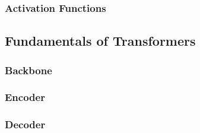       \Blindtext[1]

    \subsubsection{Activation Functions}

      \Blindtext[1]
  
  \subsection{Fundamentals of Transformers}

    \Blindtext[1]

    \subsubsection{Backbone}

      \Blindtext[1]

    \subsubsection{Encoder}

      \Blindtext[1]

    \subsubsection{Decoder}

      \Blindtext[1]
